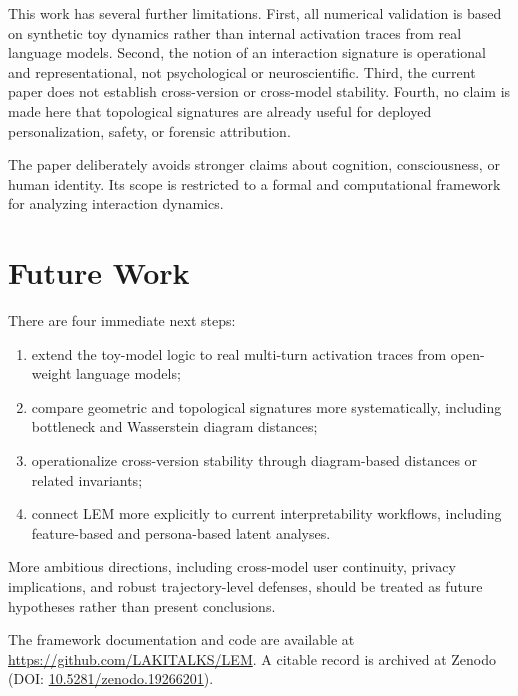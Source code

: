 \documentclass[11pt]{article}
\begin{document}
This work has several further limitations. First, all numerical validation is based on
synthetic toy dynamics rather than internal activation traces from real language
models. Second, the notion of an interaction signature is operational and
representational, not psychological or neuroscientific. Third, the current paper does
not establish cross-version or cross-model stability. Fourth, no claim is made here
that topological signatures are already useful for deployed personalization, safety,
or forensic attribution.

The paper deliberately avoids stronger claims about cognition, consciousness, or human
identity. Its scope is restricted to a formal and computational framework for
analyzing interaction dynamics.


\section{Future Work}

There are four immediate next steps:

\begin{enumerate}[leftmargin=1.8em]
  \item extend the toy-model logic to real multi-turn activation traces from
        open-weight language models;
  \item compare geometric and topological signatures more systematically, including
        bottleneck and Wasserstein diagram distances;
  \item operationalize cross-version stability through diagram-based distances or
        related invariants;
  \item connect LEM more explicitly to current interpretability workflows, including
        feature-based and persona-based latent analyses.
\end{enumerate}

More ambitious directions, including cross-model user continuity, privacy
implications, and robust trajectory-level defenses, should be treated as future
hypotheses rather than present conclusions.

The framework documentation and code are available at
\url{https://github.com/LAKITALKS/LEM}. A citable record is archived at Zenodo
(DOI: \href{https://doi.org/10.5281/zenodo.19266201}{10.5281/zenodo.19266201}).
\end{document}
